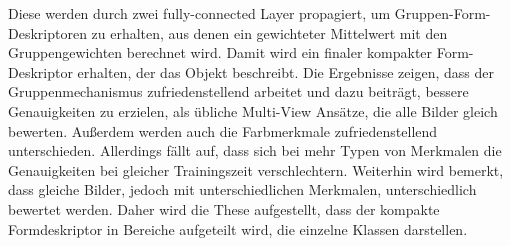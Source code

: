 \documentclass[a4paper,            	%
               12pt,               	%
               chapterprefix,      	%
               appendixprefix,		%
               headsepline,        	%
               twoside,				%
               draft=false]         %
               {scrbook}			%
\theoremstyle{defstyle}
\theoremstyle{bspstyle}
\begin{document}
\begin{BaMaAbstract}
{	Diese werden durch zwei fully-connected Layer propagiert, um Gruppen-Form-Deskriptoren zu erhalten, aus denen ein gewichteter Mittelwert mit den Gruppengewichten berechnet wird.
	Damit wird ein finaler kompakter Form-Deskriptor erhalten, der das Objekt beschreibt.
	Die Ergebnisse zeigen, dass der Gruppenmechanismus zufriedenstellend arbeitet und dazu beiträgt, bessere Genauigkeiten zu erzielen, als übliche Multi-View Ansätze, die alle Bilder gleich bewerten.
	Außerdem werden auch die Farbmerkmale zufriedenstellend unterschieden.
	Allerdings fällt auf, dass sich bei mehr Typen von Merkmalen die Genauigkeiten bei gleicher Trainingszeit verschlechtern.
	Weiterhin wird bemerkt, dass gleiche Bilder, jedoch mit unterschiedlichen Merkmalen, unterschiedlich bewertet werden.
	Daher wird die These aufgestellt, dass der kompakte Formdeskriptor in Bereiche aufgeteilt wird, die einzelne Klassen darstellen.
}
\end{BaMaAbstract}

\setcounter{secnumdepth}{2} %
\tableofcontents		%
\listoffigures			%
\listoftables			%
 
\markboth{\nomname}{\nomname}  %
\printnomenclature     %

 
\mainmatter				%









\backmatter			%

\begingroup
\raggedright\sloppy
\endgroup

\end{document}
